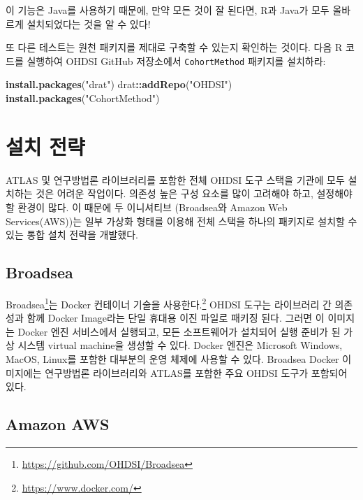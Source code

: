 \documentclass[10.5pt]{book}
\newenvironment{Shaded}{\begin{snugshade}}{\end{snugshade}}
\newcommand{\KeywordTok}[1]{\textcolor[rgb]{0.13,0.29,0.53}{\textbf{#1}}}
\newcommand{\StringTok}[1]{\textcolor[rgb]{0.31,0.60,0.02}{#1}}
\newcommand{\OperatorTok}[1]{\textcolor[rgb]{0.81,0.36,0.00}{\textbf{#1}}}
\newcommand{\NormalTok}[1]{#1}
\let\rmarkdownfootnote\footnote%
\def\footnote{\protect\rmarkdownfootnote}
\theoremstyle{definition}
\theoremstyle{definition}
\theoremstyle{definition}
\theoremstyle{remark}
\begin{document}
이 기능은 Java를 사용하기 때문에, 만약 모든 것이 잘 된다면, R과 Java가
모두 올바르게 설치되었다는 것을 알 수 있다!

또 다른 테스트는 원천 패키지를 제대로 구축할 수 있는지 확인하는 것이다.
다음 R 코드를 실행하여 OHDSI GitHub 저장소에서 \texttt{CohortMethod}
패키지를 설치하라:

\begin{Shaded}
\begin{Highlighting}[]
\KeywordTok{install.packages}\NormalTok{(}\StringTok{"drat"}\NormalTok{)}
\NormalTok{drat}\OperatorTok{::}\KeywordTok{addRepo}\NormalTok{(}\StringTok{"OHDSI"}\NormalTok{)}
\KeywordTok{install.packages}\NormalTok{(}\StringTok{"CohortMethod"}\NormalTok{)}
\end{Highlighting}
\end{Shaded}

\section{설치 전략}\label{-}

ATLAS 및 연구방법론 라이브러리를 포함한 전체 OHDSI 도구 스택을 기관에
모두 설치하는 것은 어려운 작업이다. 의존성 높은 구성 요소를 많이
고려해야 하고, 설정해야 할 환경이 많다. 이 때문에 두 이니셔티브
(Broadsea와 Amazon Web Services(AWS))는 일부 가상화 형태를 이용해 전체
스택을 하나의 패키지로 설치할 수 있는 통합 설치 전략을 개발했다.

\subsection{Broadsea}\label{broadsea}

Broadsea\footnote{\url{https://github.com/OHDSI/Broadsea}}는 Docker
컨테이너 기술을 사용한다.\footnote{\url{https://www.docker.com/}} OHDSI
도구는 라이브러리 간 의존성과 함께 Docker Image라는 단일 휴대용 이진
파일로 패키징 된다. 그러면 이 이미지는 Docker 엔진 서비스에서 실행되고,
모든 소프트웨어가 설치되어 실행 준비가 된 가상 시스템 virtual machine을
생성할 수 있다. Docker 엔진은 Microsoft Windows, MacOS, Linux를 포함한
대부분의 운영 체제에 사용할 수 있다. Broadsea Docker 이미지에는
연구방법론 라이브러리와 ATLAS를 포함한 주요 OHDSI 도구가 포함되어 있다.

\subsection{Amazon AWS}\label{amazon-aws}
\end{document}
